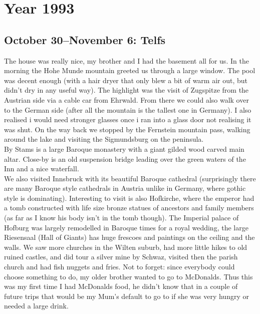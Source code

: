\chapter{Year 1993}
\label{1993}

\section{October 30--November 6: Telfs}
\label{1993:Telfs}

The house was really nice, my brother and I had the basement all for us. In the morning the Hohe Munde mountain greeted us through a large window. The pool was decent enough (with a hair dryer that only blew a bit of warm air out, but didn't dry in any useful way).
The highlight was the visit of Zugspitze from the Austrian side via a cable car from Ehrwald. From there we could also walk over to the German side (after all the mountain is the tallest one in Germany). I also realised i would need stronger glasses once i ran into a glass door not realising it was shut. On the way back we stopped by the Fernstein mountain pass, walking around the lake and visiting the Sigmundsburg on the peninsula.\\
By Stams is a large Baroque monastery with a giant gilded wood carved main altar. Close-by is an old suspension bridge leading over the green waters of the Inn and a nice waterfall.\\
We also visited Innsbruck with its beautiful Baroque cathedral (surprisingly there are many Baroque style cathedrals in Austria unlike in Germany, where gothic style is dominating). Interesting to visit is also Hofkirche, where the emperor had a tomb constructed with life size bronze statues of ancestors and family members (as far as I know his body isn't in the tomb though). The Imperial palace of Hofburg was largely remodelled in Baroque times for a royal wedding, the large Riesensaal (Hall of Giants) has huge frescoes and paintings on the ceiling and the walls. We saw more churches in the Wilten suburb, had more little hikes to old ruined castles, and did tour a silver mine by Schwaz, visited then the parish church and had fish nuggets and fries.
Not to forget: since everybody could choose something to do, my older brother wanted to go to McDonalds. Thus this was my first time I had McDonalds food, he didn't know that in a couple of future trips that would be my Mum's default to go to if she was very hungry or needed a large drink.

